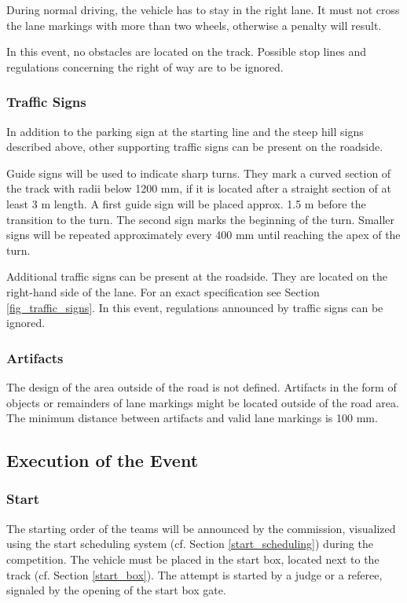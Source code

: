 During normal driving, the vehicle has to stay in the right lane. It must not
cross the lane markings with more than two wheels, otherwise a penalty will
result.

In this event, no obstacles are located on the track. Possible stop lines and
regulations concerning the right of way are to be ignored.

\subsubsection{Traffic Signs}
\label{traffic_signs}

In addition to the parking sign at the starting line and the steep hill signs
described above, other supporting traffic signs can be present on the roadside.

Guide signs will be used to indicate sharp turns. They mark a curved section of
the track with radii below 1200 mm, if it is located after a straight section
of at least 3 m length. A first guide sign will be placed approx. 1.5 m before
the transition to the turn. The second sign marks the beginning of the turn.
Smaller signs will be repeated approximately every 400 mm until reaching the
apex of the turn.

Additional traffic signs can be present at the roadside. They are located on
the right-hand side of the lane. For an exact specification see Section
\ref{fig_traffic_signs}. In this event, regulations announced by traffic signs
can be ignored.

\subsubsection{Artifacts}
\label{artifacts}

The design of the area outside of the road is not defined. Artifacts in the
form of objects or remainders of lane markings might be located outside of the
road area. The minimum distance between artifacts and valid lane markings is
100 mm.

\subsection{Execution of the Event}

\subsubsection{Start}

The starting order of the teams will be announced by the commission, visualized
using the start scheduling system (cf. Section \ref{start_scheduling}) during
the competition. The vehicle must be placed in the start box, located next to
the track (cf. Section \ref{start_box}). The attempt is started by a judge or a
referee, signaled by the opening of the start box gate.

